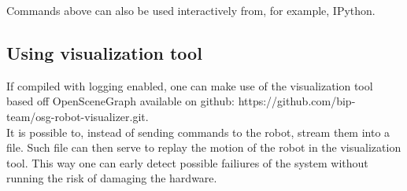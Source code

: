 \noindent Commands above can also be used interactively from, for example, IPython.

\subsection{Using visualization tool}
\noindent If compiled with logging enabled, one can make use of the visualization tool based off OpenSceneGraph
available on github: https://github.com/bip-team/osg-robot-visualizer.git. \\
\noindent It is possible to, instead of sending commands to the robot, stream them into a file. Such file can then serve
to replay the motion of the robot in the visualization tool. This way one can early detect possible failiures of the
system without running the risk of damaging the hardware.

